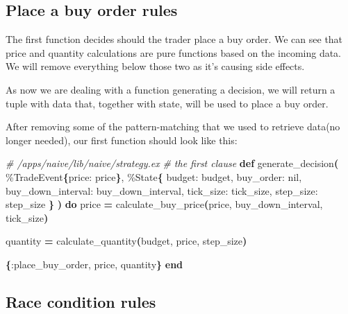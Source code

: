 \documentclass[
  oneside]{book}
\newenvironment{Shaded}{\begin{snugshade}}{\end{snugshade}}
\newcommand{\CommentTok}[1]{\textcolor[rgb]{0.56,0.35,0.01}{\textit{#1}}}
\newcommand{\ConstantTok}[1]{\textcolor[rgb]{0.56,0.35,0.01}{#1}}
\newcommand{\FunctionTok}[1]{\textcolor[rgb]{0.13,0.29,0.53}{\textbf{#1}}}
\newcommand{\KeywordTok}[1]{\textcolor[rgb]{0.13,0.29,0.53}{\textbf{#1}}}
\newcommand{\NormalTok}[1]{#1}
\newcommand{\OperatorTok}[1]{\textcolor[rgb]{0.81,0.36,0.00}{\textbf{#1}}}
\newcommand{\VariableTok}[1]{\textcolor[rgb]{0.00,0.00,0.00}{#1}}
\begin{document}
\subsection{Place a buy order rules}\label{place-a-buy-order-rules}

The first function decides should the trader place a buy order. We can see that price and quantity calculations are pure functions based on the incoming data. We will remove everything below those two as it's causing side effects.

As now we are dealing with a function generating a decision, we will return a tuple with data that, together with state, will be used to place a buy order.

After removing some of the pattern-matching that we used to retrieve data(no longer needed), our first function should look like this:

\begin{Shaded}
\begin{Highlighting}[]
\CommentTok{\# /apps/naive/lib/naive/strategy.ex}
\CommentTok{\# the first clause}
  \KeywordTok{def}\NormalTok{ generate\_decision}\FunctionTok{(}
\NormalTok{        \%}\ConstantTok{TradeEvent}\FunctionTok{\{}\VariableTok{price:}\NormalTok{ price}\FunctionTok{\}}\NormalTok{,}
\NormalTok{        \%}\ConstantTok{State}\FunctionTok{\{}
          \VariableTok{budget:}\NormalTok{ budget,}
          \VariableTok{buy\_order:} \ConstantTok{nil}\NormalTok{,}
          \VariableTok{buy\_down\_interval:}\NormalTok{ buy\_down\_interval,}
          \VariableTok{tick\_size:}\NormalTok{ tick\_size,}
          \VariableTok{step\_size:}\NormalTok{ step\_size}
        \FunctionTok{\}}
      \FunctionTok{)} \KeywordTok{do}
\NormalTok{    price }\OperatorTok{=}\NormalTok{ calculate\_buy\_price}\FunctionTok{(}\NormalTok{price, buy\_down\_interval, tick\_size}\FunctionTok{)}

\NormalTok{    quantity }\OperatorTok{=}\NormalTok{ calculate\_quantity}\FunctionTok{(}\NormalTok{budget, price, step\_size}\FunctionTok{)}

    \FunctionTok{\{}\VariableTok{:place\_buy\_order}\NormalTok{, price, quantity}\FunctionTok{\}}
  \KeywordTok{end}
\end{Highlighting}
\end{Shaded}

\newpage

\subsection{Race condition rules}\label{race-condition-rules}
\end{document}
